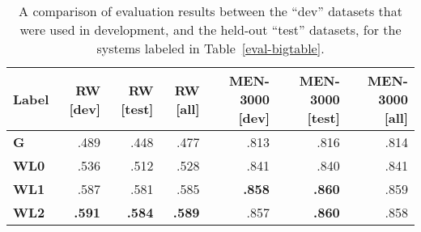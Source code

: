 \documentclass[letterpaper]{article}
\begin{document}
\begin{table*}[t]
\centering
\begin{tabular}{lrrrrrr}
\toprule
Label   & RW [dev] & RW [test] & RW [all] & MEN-3000 [dev] & MEN-3000 [test] & MEN-3000 [all]\\
\midrule
\bf G   &    .489  &    .448  &    .477  &    .813  &    .816 &    .814 \\
\bf WL0 &    .536  &    .512  &    .528  &    .841  &    .840 &    .841 \\
\bf WL1 &    .587  &    .581  &    .585  &\bf .858  &\bf .860 &    .859 \\
\bf WL2 &\bf .591  &\bf .584  &\bf .589  &    .857  &\bf .860 &    .858 \\
\bottomrule
\end{tabular}

\caption{
    A comparison of evaluation results between the ``dev'' datasets that were
    used in development, and the held-out ``test'' datasets, for the systems
    labeled in Table~\ref{eval-bigtable}.
}
\label{eval-dev-test}
\end{table*}
\end{document}
